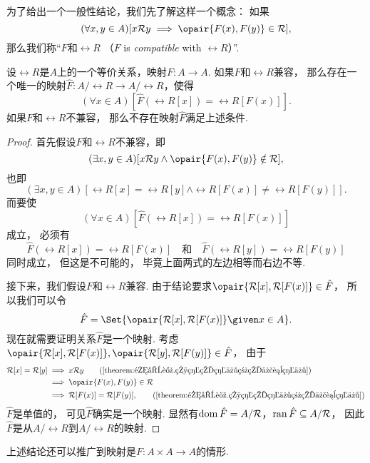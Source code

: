 为了给出一个一般性结论，我们先了解这样一个概念：
如果\begin{equation*}
	(\forall x,y \in A)
	[
		x \rel{R} y
		\implies
		\opair{F(x),F(y)} \in \rel{R}
	],
\end{equation*}
那么我们称“\(F\)和\(\rel{R}\) %
（\(F\) is \emph{compatible} with \(\rel{R}\)）”.

\begin{theorem}\label{theorem:集合论.与等价关系兼容的映射的性质}
设\(\rel{R}\)是\(A\)上的一个等价关系，映射\(F\colon A \to A\).
如果\(F\)和\(\rel{R}\)兼容，
那么存在一个唯一的映射\(\hat{F}\colon A/\rel{R} \to A/\rel{R}\)，使得\begin{equation*}
	(\forall x \in A)
	[
		\hat{F}(\rel{R}[x]) = \rel{R}[F(x)]
	].
\end{equation*}
如果\(F\)和\(\rel{R}\)不兼容，
那么不存在映射\(\hat{F}\)满足上述条件.
\begin{proof}
首先假设\(F\)和\(\rel{R}\)不兼容，即\begin{equation*}
	(\exists x,y \in A)
	[
		x \rel{R} y
		\land
		\opair{F(x),F(y)} \notin \rel{R}
	],
\end{equation*}
也即\begin{equation*}
	(\exists x,y \in A)
	[
		\rel{R}[x] = \rel{R}[y]
		\land
		\rel{R}[F(x)] \neq \rel{R}[F(y)]
	].
\end{equation*}
而要使\begin{equation*}
	(\forall x \in A)
	[
		\hat{F}(\rel{R}[x]) = \rel{R}[F(x)]
	]
\end{equation*}成立，
必须有\begin{equation*}
	\hat{F}(\rel{R}[x])
	= \rel{R}[F(x)]
	\quad\text{和}\quad
	\hat{F}(\rel{R}[y])
	= \rel{R}[F(y)]
\end{equation*}同时成立，
但这是不可能的，
毕竟上面两式的左边相等而右边不等.

接下来，我们假设\(F\)和\(\rel{R}\)兼容.
由于结论要求\(\opair{\rel{R}[x],\rel{R}[F(x)]} \in \hat{F}\)，
所以我们可以令\begin{equation*}
	\hat{F} = \Set{ \opair{\rel{R}[x],\rel{R}[F(x)]} \given x \in A }.
\end{equation*}
现在就需要证明关系\(\hat{F}\)是一个映射.
考虑\(\opair{\rel{R}[x],\rel{R}[F(x)]},
\opair{\rel{R}[y],\rel{R}[F(y)]} \in \hat{F}\)，
由于\begin{align*}
	\rel{R}[x] = \rel{R}[y]
	&\implies
	x \rel{R} y
	\tag{\cref{theorem:集合论.相等的等价类的代表等价}} \\
	&\implies
	\opair{F(x),F(y)} \in \rel{R} \\
	&\implies
	\rel{R}[F(x)] = \rel{R}[F(y)],
	\tag{\cref{theorem:集合论.相等的等价类的代表等价}}
\end{align*}
\(\hat{F}\)是单值的，
可见\(\hat{F}\)确实是一个映射.
显然有\(\operatorname{dom} \hat{F} = A/\mathcal{R}\)，\(\operatorname{ran} \hat{F} \subseteq A/\mathcal{R}\)，
因此\(\hat{F}\)是从\(A/\rel{R}\)到\(A/\rel{R}\)的映射.
\end{proof}
\end{theorem}
上述结论还可以推广到映射是\(F\colon A \times A \to A\)的情形.
